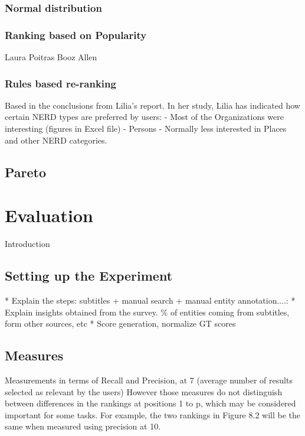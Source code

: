 \documentclass{llncs}
\begin{document}
\subsubsection{Normal distribution}

\subsubsection{Ranking based on Popularity}
Laura Poitras
Booz Allen

\subsubsection{Rules based re-ranking}
Based in the conclusions from Lilia's report. In her study, Lilia has indicated how certain NERD types are preferred by users:
- Most of the Organizations were interesting (figures in Excel file)
- Persons
- Normally less interested in Places and other NERD categories.

\subsection{Pareto}


\section{Evaluation}
\label{sec:Evaluation}
Introduction

\subsection{Setting up the Experiment}
\label{sec:settingUp}


* Explain the steps: subtitles + manual search + manual  entity annotation....:
* Explain insights obtained from the survey. \% of entities coming from subtitles, form other sources, etc
* Score generation, normalize GT scores

\subsection{Measures}
Measurements in terms of Recall and Precision, at 7 (average number of results selected as relevant by the users)
However those measures do not distinguish between differences in the rankings at positions 1 to p, which may be considered important for some tasks. For example, the two rankings in Figure 8.2 will be the same when measured using precision at 10.
\end{document}
